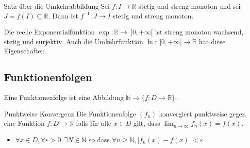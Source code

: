 \documentclass[a4paper,fontsize = 7pt]{scrartcl}
\def\limn{\lim_{n\to \infty}}
\def\R{\mathbb{R}}
\def\N{\mathbb{N}}
\begin{document}
\begin{mainbox}{Satz über die Umkehrabbildung}
  \vspace{-4pt}
 Sei $f: I \to \R$ stetig und streng monoton und sei $J = f(I) \subseteq \R$. Dann ist $f^{-1}: J \to I$ stetig und streng monoton.
 \vspace{-4pt}
\end{mainbox}

\begin{subbox}{Die reelle Exponentialfunktion}
  \vspace{-4pt}
  $\exp: \R \to \ ]0,+\infty[$ ist streng monoton wachsend, stetig und surjektiv. Auch die Umkehrfunktion $\ln: \ ]0,+\infty[ \to \R$ hat diese Eigenschaften.
  \vspace{-4pt}
\end{subbox}

\subsection{Funktionenfolgen}
Eine Funktionenfolge ist eine Abbildung $\N \to \{f: D \to \R \}$.
\begin{mainbox}{Punktweise Konvergenz}
  \vspace{-6pt}
  Die Funktionenfolge $(f_n)$ konvergiert punktweise gegen eine Funktion $f: D \to \R$ falls für alle $x \in D$ gilt, dass $\limn f_n(x) = f(x)$.
  \begin{itemize}
  \item $\forall x \in D, \forall \varepsilon>0, \exists N \in \N$ so dass $\forall n \geq \N, |f_n(x) -f(x)|<\varepsilon$
  \end{itemize}
  \vspace{-12pt}
\end{mainbox}
\end{document}
